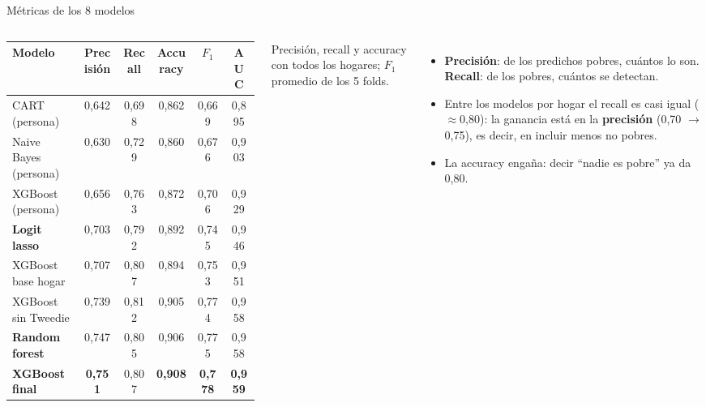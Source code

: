 \documentclass[aspectratio=169,10pt,xcolor=table]{beamer}
\begin{document}
\begin{frame}{Métricas de los 8 modelos}
\begin{columns}[T]
\footnotesize
\setlength{\tabcolsep}{4pt}
\begin{tabular}{@{}lccccc@{}}
\toprule
Modelo & Precisión & Recall & Accuracy & $F_1$ & AUC \\
\midrule
CART (persona)        & 0,642 & 0,698 & 0,862 & 0,669 & 0,895 \\
Naive Bayes (persona) & 0,630 & 0,729 & 0,860 & 0,676 & 0,903 \\
XGBoost (persona)     & 0,656 & 0,763 & 0,872 & 0,706 & 0,929 \\
\midrule
\textcolor{clogit}{\textbf{Logit lasso}} & 0,703 & 0,792 & 0,892 & 0,745 & 0,946 \\
XGBoost base hogar    & 0,707 & 0,807 & 0,894 & 0,753 & 0,951 \\
\midrule
XGBoost sin Tweedie   & 0,739 & 0,812 & 0,905 & 0,774 & 0,958 \\
\textcolor{crf}{\textbf{Random forest}} & 0,747 & 0,805 & 0,906 & 0,775 & 0,958 \\
\textcolor{cxgb}{\textbf{XGBoost final}} & \textbf{0,751} & 0,807 & \textbf{0,908} & \textbf{0,778} & \textbf{0,959} \\
\bottomrule
\end{tabular}

\vspace{1mm}
\tiny Precisión, recall y accuracy con todos los hogares; $F_1$ promedio de
los 5 folds.

\small
\begin{itemize}
  \item \textbf{Precisión}: de los predichos pobres, cuántos lo son.
    \textbf{Recall}: de los pobres, cuántos se detectan.
  \item Entre los modelos por hogar el recall es casi igual
    ($\approx$0,80): la ganancia está en la \textbf{precisión} (0,70
    $\to$ 0,75), es decir, en incluir menos no pobres.
  \item La accuracy engaña: decir ``nadie es pobre'' ya da 0,80.
\end{itemize}
\end{columns}
\end{frame}
\end{document}
